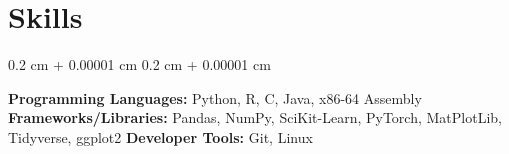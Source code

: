 \documentclass[10pt, letterpaper]{article}
\newenvironment{onecolentry}{
    \begin{adjustwidth}{
        0.2 cm + 0.00001 cm
    }{
        0.2 cm + 0.00001 cm
    }
}{
    \end{adjustwidth}
} %
\begin{document}
    \section{Skills}
        \begin{onecolentry}
            \textbf{Programming Languages:} Python, R, C, Java, x86-64 Assembly \newline
            \textbf{Frameworks/Libraries:} Pandas, NumPy, SciKit-Learn, PyTorch, MatPlotLib, Tidyverse, ggplot2 \newline
            \textbf{Developer Tools:} Git, Linux

        \end{onecolentry}


    \vspace{0.20 cm}

    

    
\end{document}
